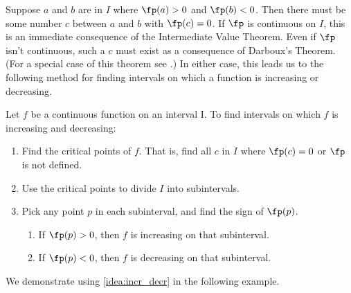Suppose $a$ and $b$ are in $I$ where $\fp(a)>0$ and $\fp(b)<0$. Then there must be some number $c$ between $a$ and $b$ with $\fp(c)=0$. If $\fp$ is continuous on $I$, this is an immediate consequence of the Intermediate Value Theorem.  Even if $\fp$ isn't continuous, such a $c$ must exist as a consequence of Darboux's Theorem.  (For a special case of this theorem see .)  In either case, this leads us to the following method for finding intervals on which a function is increasing or decreasing.

{Let $f$ be a continuous function on an interval I. To find intervals on which $f$ is increasing and decreasing:
\begin{enumerate}
\item	Find the critical points of $f$. That is, find all $c$ in $I$ where $\fp(c) = 0$ or $\fp$ is not defined.
\item	Use the critical points to divide $I$ into subintervals.
\item	Pick any point $p$ in each subinterval, and find the sign of $\fp(p)$. 
		\begin{enumerate}
		\item	If $\fp(p)>0$, then $f$ is increasing on that subinterval.
		\item	If $\fp(p)<0$, then $f$ is decreasing on that subinterval.
		\end{enumerate}
\end{enumerate}}


We demonstrate using \autoref{idea:incr_decr} in the following example.

